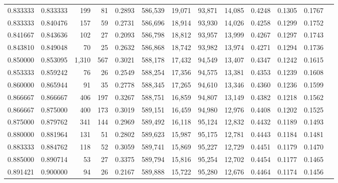 \begin{tabular}{rrrrrrrrrrrrr}
0.833333 & 0.833333 &    199 &     81 &                                     0.2893 & 586,539 &  19,071 &  93,871 &  14,085 & 0.4248 & 0.1305 & 0.1767 \\
0.833333 & 0.840476 &    157 &     59 &                                     0.2731 & 586,696 &  18,914 &  93,930 &  14,026 & 0.4258 & 0.1299 & 0.1752 \\
0.841667 & 0.843636 &    102 &     27 &                                     0.2093 & 586,798 &  18,812 &  93,957 &  13,999 & 0.4267 & 0.1297 & 0.1743 \\
0.843810 & 0.849048 &     70 &     25 &                                     0.2632 & 586,868 &  18,742 &  93,982 &  13,974 & 0.4271 & 0.1294 & 0.1736 \\
0.850000 & 0.853095 &  1,310 &    567 &                                     0.3021 & 588,178 &  17,432 &  94,549 &  13,407 & 0.4347 & 0.1242 & 0.1615 \\
0.853333 & 0.859242 &     76 &     26 &                                     0.2549 & 588,254 &  17,356 &  94,575 &  13,381 & 0.4353 & 0.1239 & 0.1608 \\
0.860000 & 0.865944 &     91 &     35 &                                     0.2778 & 588,345 &  17,265 &  94,610 &  13,346 & 0.4360 & 0.1236 & 0.1599 \\
0.866667 & 0.866667 &    406 &    197 &                                     0.3267 & 588,751 &  16,859 &  94,807 &  13,149 & 0.4382 & 0.1218 & 0.1562 \\
0.866667 & 0.875000 &    400 &    173 &                                     0.3019 & 589,151 &  16,459 &  94,980 &  12,976 & 0.4408 & 0.1202 & 0.1525 \\
0.875000 & 0.879762 &    341 &    144 &                                     0.2969 & 589,492 &  16,118 &  95,124 &  12,832 & 0.4432 & 0.1189 & 0.1493 \\
0.880000 & 0.881964 &    131 &     51 &                                     0.2802 & 589,623 &  15,987 &  95,175 &  12,781 & 0.4443 & 0.1184 & 0.1481 \\
0.883333 & 0.884762 &    118 &     52 &                                     0.3059 & 589,741 &  15,869 &  95,227 &  12,729 & 0.4451 & 0.1179 & 0.1470 \\
0.885000 & 0.890714 &     53 &     27 &                                     0.3375 & 589,794 &  15,816 &  95,254 &  12,702 & 0.4454 & 0.1177 & 0.1465 \\
0.891421 & 0.900000 &     94 &     26 &                                     0.2167 & 589,888 &  15,722 &  95,280 &  12,676 & 0.4464 & 0.1174 & 0.1456 \\

\end{tabular}
